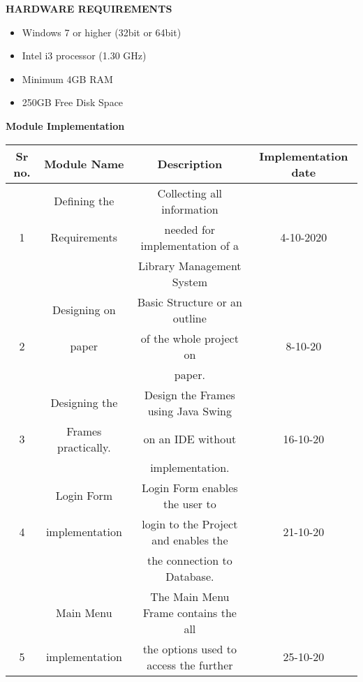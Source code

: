 \documentclass{article}
\begin{document}
\begin{center}
\textbf{HARDWARE REQUIREMENTS}\newline
\end{center}
\Large
\begin{itemize}  
\item Windows 7 or higher (32bit or 64bit)
\item Intel i3 processor (1.30 GHz)
\item Minimum 4GB RAM
\item 250GB Free Disk Space \newline
\end{itemize}
\Large
\begin{center}
\textbf{Module Implementation} \newline
\end{center}
\begin{center}
\large
\begin{tabular}{ |c|c|c|c|} 
 \hline
 \textbf {Sr no.}  & \textbf{Module Name }  & \textbf{Description} & \textbf{Implementation date} \\
 \hline
   &  Defining the   & Collecting all information &   \\ 
 1 &  Requirements   & needed for implementation of a  &   4-10-2020   \\
   &                 &  Library Management System   &      \\
\hline
   &  Designing on  & Basic Structure or an outline  &    \\ 
 2 &  paper         & of the whole project on    &  8-10-20   \\
   &                & paper.                     &      \\
\hline
   &  Designing the  & Design the Frames using Java Swing   &    \\ 
 3 &  Frames practically.   & on an IDE without     &  16-10-20   \\
   &                & implementation.                    &      \\
\hline
  &  Login Form    & Login Form enables the user to            &     \\
 4& implementation      & login to the Project and enables the      &  21-10-20  \\
  &                  & the connection to Database.               &       \\
 \hline
 &  Main Menu  & The Main Menu Frame contains the all      &     \\ 
 5 & implementation & the options used to access the further    &  25-10-20    \\

\end{tabular}
\end{center}
\end{document}
